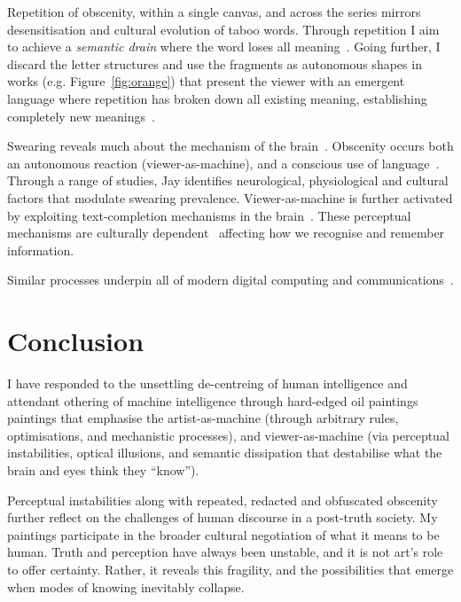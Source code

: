 \documentclass[12pt]{article}
\begin{document}
Repetition of obscenity, within a single canvas, and across the series
mirrors desensitisation and cultural evolution of taboo words.
Through repetition I aim to achieve a \emph{semantic drain} where the
word loses all
meaning~\cite{barthes1957mythologies,derrida1972dissemination}. Going
further, I discard the letter structures and use the fragments as
autonomous shapes in works (e.g. Figure~\ref{fig:orange}) that present
the viewer with an emergent language where repetition has broken down
all existing meaning, establishing completely new
meanings~\cite{derrida1972dissemination,deleuze1968difference,baudrillard1981simulacra}.

Swearing reveals much about the mechanism of the
brain~\cite{bergen2018what}. Obscenity occurs both an autonomous
reaction (viewer-as-machine), and a conscious use of
language~\cite{jay1999why}.  Through a range of studies, Jay
identifies neurological, physiological and cultural factors that
modulate swearing prevalence. Viewer-as-machine is further activated
by exploiting text-completion mechanisms in the
brain~\cite{Taylor1953,Reicher1969,Healy1976,GraingerWhitney2004,CohenDehaene2000,Levy2008}. These
perceptual mechanisms are culturally
dependent~\cite{Bartlett1932,Hall1976,ChuaBolandNisbett2005,MasudaNisbett2001}
affecting how we recognise and remember information.

Similar processes underpin all of modern digital computing and
communications~\cite{shannon1948}.

\section{Conclusion}
I have responded to the unsettling de-centreing of human intelligence
and attendant othering of machine intelligence through hard-edged oil
paintings paintings that emphasise the artist-as-machine (through
arbitrary rules, optimisations, and mechanistic processes), and
viewer-as-machine (via perceptual instabilities, optical illusions,
and semantic dissipation that destabilise what the brain and eyes
think they ``know''). 

Perceptual instabilities along with repeated, redacted and obfuscated
obscenity further reflect on the challenges of human discourse in a
post-truth society. My paintings participate in the broader cultural
negotiation of what it means to be human. Truth and perception have
always been unstable, and it is not art's role to offer
certainty. Rather, it reveals this fragility, and the possibilities
that emerge when modes of knowing inevitably collapse.
\end{document}

